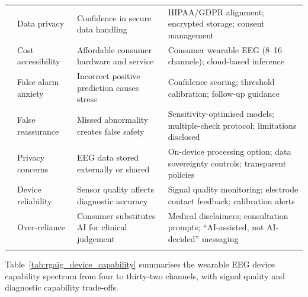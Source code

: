 \begin{xltabular}{\textwidth}{@{} p{2.5cm} p{2.8cm} X X @{}}
\addlinespace
    & Data privacy       & Confidence in secure data handling & HIPAA/GDPR alignment; encrypted storage; consent management \\
\addlinespace
    & Cost accessibility & Affordable consumer hardware and service & Consumer wearable EEG (8--16 channels); cloud-based inference \\
\addlinespace
\midrule
{}
    & False alarm anxiety & Incorrect positive prediction causes stress & Confidence scoring; threshold calibration; follow-up guidance \\
\addlinespace
    & False reassurance  & Missed abnormality creates false safety & Sensitivity-optimised models; multiple-check protocol; limitations disclosed \\
\addlinespace
    & Privacy concerns   & EEG data stored externally or shared & On-device processing option; data sovereignty controls; transparent policies \\
\addlinespace
    & Device reliability & Sensor quality affects diagnostic accuracy & Signal quality monitoring; electrode contact feedback; calibration alerts \\
\addlinespace
    & Over-reliance      & Consumer substitutes AI for clinical judgement & Medical disclaimers; consultation prompts; ``AI-assisted, not AI-decided'' messaging \\
\addlinespace
\midrule
{} \\
\end{xltabular}
\endgroup

\vspace{1.5em}

Table~\ref{tab:rgaig_device_capability} summarises the wearable EEG device capability spectrum from four to thirty-two channels, with signal quality and diagnostic capability trade-offs.

